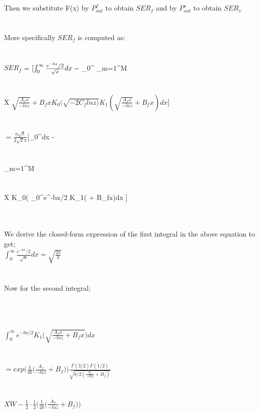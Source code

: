\documentclass{article}
\begin{document}
\\\\Then we substitute F(x) by $P_{out}^{f}$ to obtain $SER_f$ and by $P_{out}^{v}$ to obtain $SER_v$
\\
\\\\More specifically $SER_f$ is computed as:
\\
\\\\$SER_f$ =   $[\int_0^\infty\frac{e^{-bx}/{2}}{\sqrt x}dx -
\\
\\\\ $\int_0^\infty {}  \sum_{m=1}^{M} 
\\
\\\\ X $\sqrt{\frac{A_f x}{-ln z}} + B_fxK_0(\sqrt{-2C_flnz)}K_1(\sqrt{\frac{A_f x}{-ln z}} + B_fx)dx]$ $ $
\\

\\\\$= \frac{a\sqrt b}{2\sqrt2\pi} $[\int_0^\infty{}dx -
\\
\\\\  \sum_{m=1}^{M} 
\\
\\\\X K_0( \int_0^\infty e^-bx/2 K_1\big( + B_fx)dx ] $ $

\\\\We derive the closed-form expression of the first integral in the above equation to get;
\\
$\int_0^\infty \frac{e^{-bx}/{2}}{\sqrt x}dx = \sqrt{\frac{2\pi}{b}}$
\\
\\\\Now for the second integral;

\\
\\\\$\int_0^\infty e^{-bx/2}K_1\big(\sqrt{\frac{A_f x}{-ln z} + B_fx}\big)dx$
\\
\\\\$= exp\big(\frac{1}{4b}\big(\frac{A_f}{-lnz} + B_f\big)\big)\frac{\Gamma(3/2)\Gamma(1/2)}{\sqrt{b/2(\frac{A_f}{-lnz} + B_f)}}$
\\
\\\\$X W - \frac{1}{2}\cdot\frac{1}{2}\big(\frac{1}{2b}\big(\frac{A_f}{-lnz} + B_f\big)\big)$
\\
\end{document}
